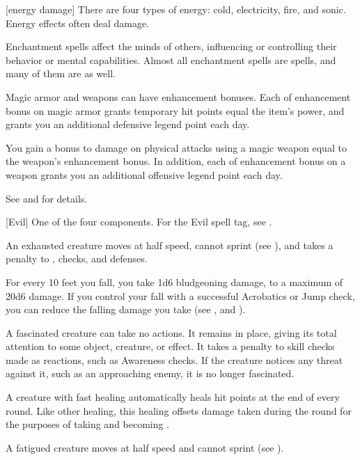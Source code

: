 [energy damage] There are four types of energy: cold, electricity, fire, and sonic. Energy effects often deal damage.

 Enchantment spells affect the minds of others, influencing or controlling their behavior or mental capabilities. Almost all enchantment spells are  spells, and many of them are  as well.

 Magic armor and weapons can have enhancement bonuses.
Each  of enhancement bonus on magic armor grants temporary hit points equal the item's power, and grants you an additional defensive legend point each day.

You gain a bonus to damage on physical attacks using a magic weapon equal to the weapon's enhancement bonus.
In addition, each  of enhancement bonus on a weapon grants you an additional offensive legend point each day.

See  and  for details.

[Evil] One of the four  components. For the Evil spell tag, see .

 An exhausted creature moves at half speed, cannot sprint (see ), and takes a  penalty to , checks, and defenses.

 For every 10 feet you fall, you take 1d6 bludgeoning damage, to a maximum of 20d6 damage.
If you control your fall with a successful Acrobatics or Jump check, you can reduce the falling damage you take (see , and ).

 A fascinated creature can take no actions. It remains in place, giving its total attention to some object, creature, or effect. It takes a  penalty to skill checks made as reactions, such as Awareness checks. If the creature notices any threat against it, such as an approaching enemy, it is no longer fascinated.

 A creature with fast healing automatically heals hit points at the end of every round.
Like other healing, this healing offsets damage taken during the round for the purposes of taking  and becoming \disabled.

 A fatigued creature moves at half speed and cannot sprint (see ).

